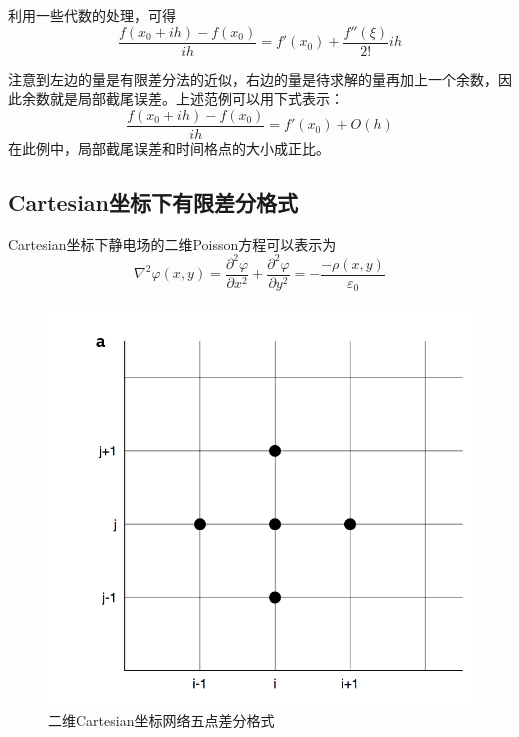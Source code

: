 \documentclass[twoside,twocolumn]{article}
\begin{document}
\begin{CJK*}{UTF8}{gkai}
	利用一些代数的处理，可得
	\begin{equation*}
	{\frac {f(x_{0}+ih)-f(x_{0})}{ih}}=f'(x_{0})+{\frac {f''(\xi )}{2!}}ih
	\end{equation*}
	
	注意到左边的量是有限差分法的近似，右边的量是待求解的量再加上一个余数，因此余数就是局部截尾误差。上述范例可以用下式表示：
	\begin{equation*}
	{\frac {f(x_{0}+ih)-f(x_{0})}{ih}}=f'(x_{0})+O(h)
	\end{equation*}
	在此例中，局部截尾误差和时间格点的大小成正比。
	\subsection{Cartesian坐标下有限差分格式}
	Cartesian坐标下静电场的二维Poisson方程可以表示为
	\begin{equation*}
	\nabla^{2}\varphi(x,y)=\frac{\partial^{2}\varphi}{\partial x^{2}}+\frac{\partial^{2}\varphi}{\partial y^{2}}=-\frac{-\rho (x,y)}{\varepsilon_{0}}
	\end{equation*}
	\begin{figure}[h]
	\centering
	\includegraphics[width=0.9\linewidth]{figure/figure2}
	\caption{二维Cartesian坐标网络五点差分格式}
	\label{fig:figure2}
	\end{figure}
	

\end{CJK*}
\end{document}
